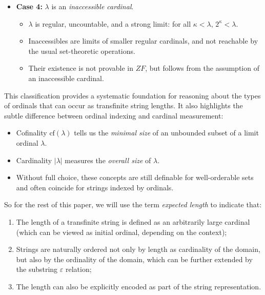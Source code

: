 \begin{itemize}
    \item \textbf{Case 4:} $\lambda$ is an \emph{inaccessible cardinal}.
    \begin{itemize}
        \item $\lambda$ is regular, uncountable, and a strong limit: for all $\kappa < \lambda$, $2^\kappa < \lambda$.
        \item Inaccessibles are limits of smaller regular cardinals, and not reachable by the usual set-theoretic operations.
        \item Their existence is not provable in $ZF$, but follows from the assumption of an inaccessible cardinal.
    \end{itemize}
\end{itemize}


This classification provides a systematic foundation for reasoning about the types of ordinals that can occur as transfinite string lengths. It also highlights the subtle difference between ordinal indexing and cardinal measurement:

\begin{itemize}
  \item Cofinality $\mathrm{cf}(\lambda)$ tells us the \emph{minimal size} of an unbounded subset of a limit ordinal $\lambda$.
  \item Cardinality $|\lambda|$ measures the \emph{overall size} of $\lambda$.
  \item Without full choice, these concepts are still definable for well-orderable sets and often coincide for strings indexed by ordinals.
\end{itemize}

So for the rest of this paper, we will use the term \textit{expected length} to indicate that:

\begin{enumerate}
    \item The length of a transfinite string is defined as an arbitrarily large cardinal (which can be viewed as initial ordinal, depending on the context);
    \item Strings are naturally ordered not only by length as cardinality of the domain, but also by the ordinality of the domain, which can be further extended by the substring $\varepsilon$ relation;
    \item The length can also be explicitly encoded as part of the string representation.
\end{enumerate}

